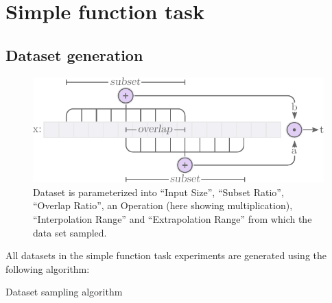 \section{Simple function task}
\subsection{Dataset generation}
\label{sec:appendix:simple-function-task:data-generation}

\begin{figure}[H]
\centering
\includegraphics[scale=0.8]{graphics/function_task_static_problem.pdf}
\caption{Dataset is parameterized into ``Input Size'', ``Subset Ratio'', ``Overlap Ratio'', an Operation (here showing multiplication), ``Interpolation Range'' and ``Extrapolation Range'' from which the data set sampled.}
\label{fig:simple-function-task-problem}
\end{figure}

All datasets in the simple function task experiments are generated using the following algorithm:

\begin{algorithm}[H]
  \caption{Dataset sampling algorithm}
  \begin{algorithmic}[1]
       
       
       
       
       
      \State {}
    \EndFunction
  \end{algorithmic}
\end{algorithm}

